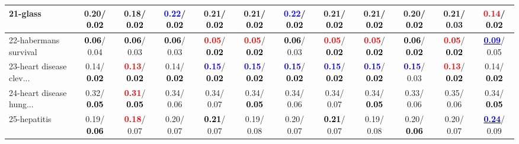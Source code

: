 \begin{table}[h]
\begin{center}
{\begin{tabular}{lc|c|c|c|c|c|c|c|c|c|c}
21-glass &   0.20/\textcolor{black}{\textbf{  0.02}} &   0.18/\textcolor{black}{\textbf{  0.02}} & \textcolor{blue}{\textbf{  0.22}}/\textcolor{black}{\textbf{  0.02}} &   0.21/\textcolor{black}{\textbf{  0.02}} &   0.21/\textcolor{black}{\textbf{  0.02}} & \textcolor{blue}{\textbf{  0.22}}/\textcolor{black}{\textbf{  0.02}} &   0.21/\textcolor{black}{\textbf{  0.02}} &   0.21/\textcolor{black}{\textbf{  0.02}} &   0.20/\textcolor{black}{\textbf{  0.02}} &   0.21/  0.03 & \textcolor{red}{\textbf{  0.14}}/\textcolor{black}{\textbf{  0.02}} \\ \hline
22-habermans survival & \textcolor{black}{\textbf{  0.06}}/  0.04 & \textcolor{black}{\textbf{  0.06}}/  0.03 & \textcolor{black}{\textbf{  0.06}}/  0.03 & \textcolor{red}{\textbf{  0.05}}/\textcolor{black}{\textbf{  0.02}} & \textcolor{red}{\textbf{  0.05}}/\textcolor{black}{\textbf{  0.02}} & \textcolor{black}{\textbf{  0.06}}/  0.03 & \textcolor{red}{\textbf{  0.05}}/\textcolor{black}{\textbf{  0.02}} & \textcolor{red}{\textbf{  0.05}}/\textcolor{black}{\textbf{  0.02}} & \textcolor{black}{\textbf{  0.06}}/\textcolor{black}{\textbf{  0.02}} & \textcolor{red}{\textbf{  0.05}}/\textcolor{black}{\textbf{  0.02}} & \underline{\textcolor{blue}{\textbf{  0.09}}}/  0.05 \\
23-heart disease clev... &   0.14/\textcolor{black}{\textbf{  0.02}} & \textcolor{red}{\textbf{  0.13}}/\textcolor{black}{\textbf{  0.02}} &   0.14/\textcolor{black}{\textbf{  0.02}} & \textcolor{blue}{\textbf{  0.15}}/\textcolor{black}{\textbf{  0.02}} & \textcolor{blue}{\textbf{  0.15}}/\textcolor{black}{\textbf{  0.02}} & \textcolor{blue}{\textbf{  0.15}}/\textcolor{black}{\textbf{  0.02}} & \textcolor{blue}{\textbf{  0.15}}/\textcolor{black}{\textbf{  0.02}} & \textcolor{blue}{\textbf{  0.15}}/\textcolor{black}{\textbf{  0.02}} & \textcolor{blue}{\textbf{  0.15}}/  0.03 & \textcolor{red}{\textbf{  0.13}}/\textcolor{black}{\textbf{  0.02}} &   0.14/\textcolor{black}{\textbf{  0.02}} \\
24-heart disease hung... &   0.32/\textcolor{black}{\textbf{  0.05}} & \textcolor{red}{\textbf{  0.31}}/\textcolor{black}{\textbf{  0.05}} &   0.34/  0.06 &   0.34/  0.07 &   0.34/\textcolor{black}{\textbf{  0.05}} &   0.34/  0.06 &   0.34/  0.07 &   0.34/\textcolor{black}{\textbf{  0.05}} &   0.33/  0.06 &   0.35/  0.06 &   0.34/\textcolor{black}{\textbf{  0.05}} \\
25-hepatitis &   0.19/\textcolor{black}{\textbf{  0.06}} & \textcolor{red}{\textbf{  0.18}}/  0.07 &   0.20/  0.07 & \textcolor{black}{\textbf{  0.21}}/  0.07 &   0.19/  0.08 &   0.20/  0.07 & \textcolor{black}{\textbf{  0.21}}/  0.07 &   0.19/  0.08 &   0.20/\textcolor{black}{\textbf{  0.06}} &   0.20/  0.07 & \underline{\textcolor{blue}{\textbf{  0.24}}}/  0.09 \\

\end{tabular}}
\end{center}
\end{table}
